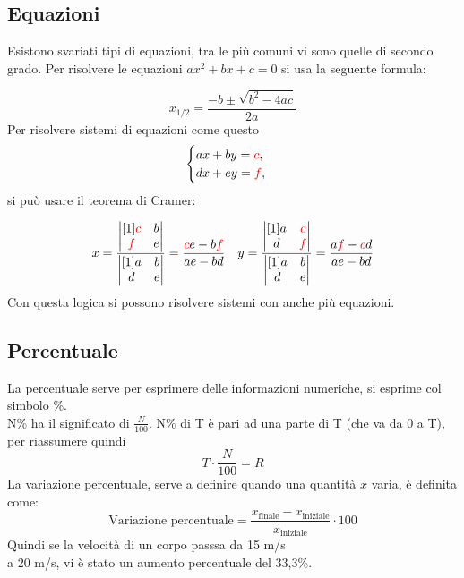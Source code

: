 \subsection{Equazioni}
Esistono svariati tipi di equazioni, tra le più comuni vi sono quelle di secondo grado. Per risolvere le equazioni   $ax^{2}+bx+c=0$  
si usa la seguente formula:

\begin{equation*}
x_{1/2}={\frac{-b\pm\sqrt{b^{2}-4ac}}{2a}}
\end{equation*}
Per risolvere sistemi di equazioni come questo
\begin{equation*}
\begin{cases}  ax+by= \textcolor{red}{c}, \\ dx+ey= \textcolor{red}{f},\\ 
\end{cases}
\end{equation*}
 si può usare il teorema di Cramer:

\begin{equation*}
  x=\dfrac{\begin{vmatrix}[1]
  \textcolor{red}{c} & b \\  
  \textcolor{red}{f} & e 
\end{vmatrix}}{\begin{vmatrix}[1] 
  a & b \\ d & e \end{vmatrix}}= 
\dfrac{\textcolor{red}{c}e-b\textcolor{red}{f}}{ae-bd}     \quad 
 y=\dfrac{\begin{vmatrix}[1]  a &\textcolor{red}{c} \\ d &  \textcolor{red}{f} \end{vmatrix}}
 {\begin{vmatrix}[1]  a & b \\ d & e \end{vmatrix}}= 
\dfrac{a \textcolor{red}{f}- \textcolor{red}{c}d}{ae-bd}
\end{equation*}
Con questa logica si possono risolvere sistemi con anche più equazioni.



\subsection{Percentuale}

La percentuale serve per esprimere delle informazioni numeriche, si esprime col simbolo \%.\\ 
N\% ha il significato di $\frac{N}{100}$. N\% di T è pari ad una parte di T (che va da 0 a T), 
per riassumere quindi 
\begin{equation*}
T\cdot\frac{N}{100}=R
\end{equation*}
La variazione percentuale, serve a definire quando una quantità $x$ varia, è definita come:
\begin{equation*}
  \text{Variazione percentuale}=
  \frac{x_{\text{finale}}-x_{\text{iniziale}}}{x_{\text{iniziale}}}\cdot100
\end{equation*}
Quindi se la velocità di un corpo passsa da 15 m/s\\ a 20 m/s, vi è stato un aumento percentuale del 33,3\%.\\

